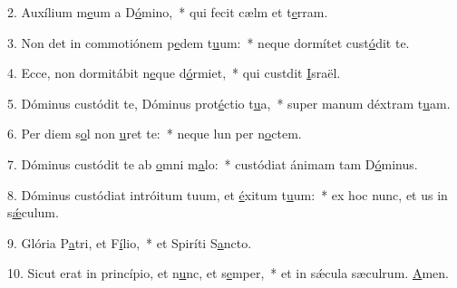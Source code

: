 2. Auxílium m\uline{e}um a D\uline{ó}mino,~* qui fecit cælm et t\uline{e}rram.\par 
3. Non det in commotiónem p\uline{e}dem t\uline{u}um:~* neque dormítet  cust\uline{ó}dit te.\par 
4. Ecce, non dormitábit n\uline{e}que d\uline{ó}rmiet,~* qui custdit \uline{I}sraël.\par 
5. Dóminus custódit te, Dóminus prot\uline{é}ctio t\uline{u}a,~* super manum déxtram t\uline{u}am.\par 
6. Per diem s\uline{o}l non \uline{u}ret te:~* neque lun per n\uline{o}ctem.\par 
7. Dóminus custódit te ab \uline{o}mni m\uline{a}lo:~* custódiat ánimam tam D\uline{ó}minus.\par 
8. Dóminus custódiat intróitum tuum, et \uline{é}xitum t\uline{u}um:~* ex hoc nunc, et us in s\uline{ǽ}culum.\par 
9. Glória P\uline{a}tri, et F\uline{í}lio,~* et Spiríti S\uline{a}ncto.\par 
10. Sicut erat in princípio, et n\uline{u}nc, et s\uline{e}mper,~* et in sǽcula sæculrum. \uline{A}men.\par 
